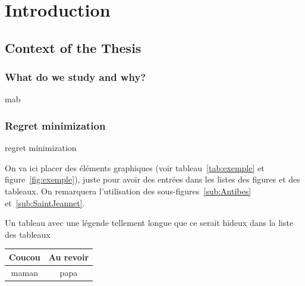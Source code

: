 \chapter{Introduction}\label{chap:intro}
	\minitoc
	\newpage





\section{Context of the Thesis}\label{sec:intro.context}
	\subsection{What do we study and why?}\label{sec:intro.context.what}
	    \gls{mab}

	\subsection{Regret minimization}\label{sec:intro.context.regret}
	\gls{regret minimization}
	
	On va ici placer des éléments graphiques (voir tableau~\ref{tab:exemple} et figure~\ref{fig:exemple}), juste pour avoir des entrées dans les listes des figures et des tableaux. On remarquera l'utilisation des sous-figures~\ref{sub:Antibes} et~\ref{sub:SaintJeannet}.

	\begin{tableth}
		\caption[Légende courte pour l'exemple de tableau]{Un tableau avec une légende tellement longue que ce serait hideux dans la liste des tableaux}
			\label{tab:exemple}
		\begin{tabular}{c|c}
			Coucou	& Au revoir\\
			\hline
			maman	& papa
		\end{tabular}
	\end{tableth}

